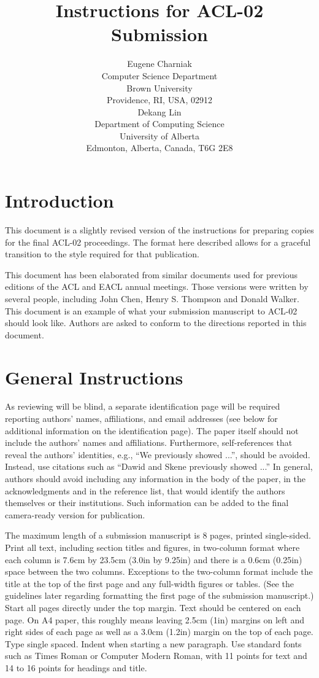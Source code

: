\documentclass[11pt]{article}
\title{Instructions for ACL-02 Submission}
\author{
\begin{tabular}[t]{c}
Eugene Charniak\\
Computer Science Department\\
Brown University\\
Providence, RI, USA, 02912 
\end{tabular}
\hspace{6pt}
\begin{tabular}[t]{c}
Dekang Lin\\
Department of Computing Science\\
University of Alberta\\
Edmonton, Alberta, Canada, T6G 2E8
\end{tabular}
}
\date{}
\begin{document}
\makeidpage
\maketitle

\section{Introduction}

This document is a slightly revised version of the instructions
for preparing copies for the final ACL-02 proceedings. The
format here described allows for a graceful transition to the
style required for that publication.

This document has been elaborated from similar documents used for
previous editions of the ACL and EACL annual meetings. Those
versions were written by several people, including John Chen,
Henry S. Thompson and Donald Walker. This document is an example
of what your submission manuscript to ACL-02 should look like.
Authors are asked to conform to the directions reported in this
document.


\section{General Instructions}

As reviewing will be blind, a separate identification page will be
required reporting authors' names, affiliations, and email addresses
(see below for additional information on the identification page).
The paper itself should not include the authors' names and
affiliations. Furthermore, self-references that reveal the authors'
identities, e.g., ``We previously showed \cite{dawidskene79} ...'',
should be avoided. Instead, use citations such as ``Dawid and Skene
 previously showed ...''  In general, authors
should avoid including any information in the body of the paper, in
the acknowledgments and in the reference list, that would identify the
authors themselves or their institutions. Such information can be
added to the final camera-ready version for publication.

The maximum length of a submission manuscript is $8$ pages,
printed single-sided.  Print all text, including section titles
and figures, in two-column format where each column is 7.6cm by
23.5cm (3.0in by 9.25in) and there is a 0.6cm (0.25in) space
between the two columns. Exceptions to the two-column format
include the title at the top of the first page and any full-width
figures or tables. (See the guidelines later regarding formatting
the first page of the submission manuscript.)  Start all pages
directly under the top margin. Text should be centered on each
page. On A4 paper, this roughly means leaving 2.5cm (1in) margins
on left and right sides of each page as well as a 3.0cm (1.2in)
margin on the top of each page. Type single spaced. Indent when
starting a new paragraph. Use standard fonts such as Times Roman
or Computer Modern Roman, with 11 points for text and 14 to 16
points for headings and title.
\end{document}
